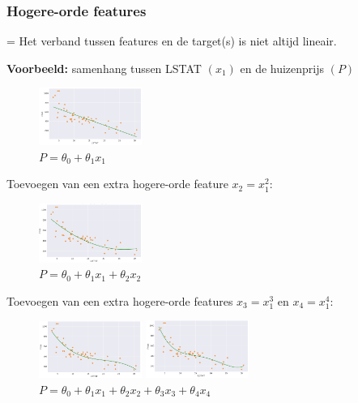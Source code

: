 \documentclass{article}
\begin{document}
\subsubsection{Hogere-orde features}

= Het verband tussen features en de target(s) is niet altijd lineair.

\textbf{Voorbeeld:} samenhang tussen LSTAT $(x_1)$ en de huizenprijs $(P)$

\begin{figure}[H]
    \centering
    \includegraphics[width=0.3\textwidth]{hogere-orde-features.png}
    \caption{$P = \theta_0 + \theta_1x_1$}
\end{figure}

Toevoegen van een extra hogere-orde feature $x_2 = x^2_1$:

\begin{figure}[H]
    \centering
    \includegraphics[width=0.3\textwidth]{hogere-orde-features2.png}
    \caption{$P = \theta_0 + \theta_1x_1 + \theta_2x_2$ }
\end{figure}

Toevoegen van een extra hogere-orde features $x_3 = x^3_1$ en $x_4 = x^4_1$:

\begin{figure}[H]
    \centering
    \includegraphics[width=0.3\textwidth]{hogere-orde-features3.png}
    \caption{$P = \theta_0 + \theta_1x_1 + \theta_2x_2 + \theta_3x_3$ }
    \includegraphics[width=0.3\textwidth]{hogere-orde-features4.png}
    \caption{$P = \theta_0 + \theta_1x_1 + \theta_2x_2 + \theta_3x_3 + \theta_4x_4$}
\end{figure}
\end{document}
